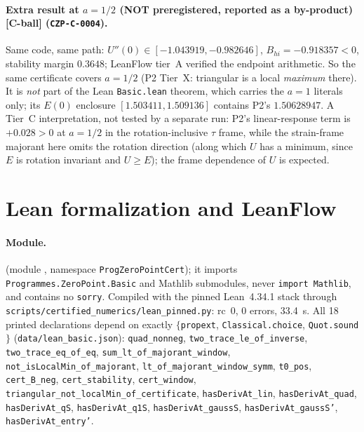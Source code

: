 \documentclass[10pt]{article}
\newcommand{\tCb}{\textcolor{blue!60!black}{\textsf{[C-ball]}}}
\newcommand{\lean}[1]{\texttt{#1}}
\begin{document}
\paragraph{Extra result at $a=1/2$ (NOT preregistered, reported as a by-product) \tCb{} (\texttt{CZP-C-0004}).} Same code, same path: $U''(0)\in[-1.043919,-0.982646]$, $B_{hi}=-0.918357<0$, stability margin $0.3648$; LeanFlow tier~A verified the endpoint arithmetic. So the same certificate covers $a=1/2$ (P2 Tier~X: triangular is a local \emph{maximum} there). It is \emph{not} part of the Lean \lean{Basic.lean} theorem, which carries the $a=1$ literals only; its $E(0)$ enclosure $[1.503411,1.509136]$ contains P2's $1.50628947$. A Tier~C interpretation, not tested by a separate run: P2's linear-response term is $+0.028>0$ at $a=1/2$ in the rotation-inclusive $\tau$ frame, while the strain-frame majorant here omits the rotation direction (along which $U$ has a minimum, since $E$ is rotation invariant and $U\ge E$); the frame dependence of $U$ is expected.

\section{Lean formalization and LeanFlow}\label{sec:lean}
\paragraph{Module.}  (module , namespace \lean{ProgZeroPointCert}); it imports \lean{Programmes.ZeroPoint.Basic} and Mathlib submodules, never \lean{import Mathlib}, and contains no \lean{sorry}. Compiled with the pinned Lean~4.34.1 stack through \texttt{scripts/certified\_numerics/lean\_pinned.py}: rc~0, 0 errors, 33.4~s. All 18 printed declarations depend on exactly $\{$\lean{propext}, \lean{Classical.choice}, \lean{Quot.sound}$\}$ (\texttt{data/lean\_basic.json}): \lean{quad\_nonneg}, \lean{two\_trace\_le\_of\_inverse}, \lean{two\_trace\_eq\_of\_eq}, \lean{sum\_lt\_of\_majorant\_window}, \lean{not\_isLocalMin\_of\_majorant}, \lean{lt\_of\_majorant\_window\_symm}, \lean{t0\_pos}, \lean{cert\_B\_neg}, \lean{cert\_stability}, \lean{cert\_window}, \lean{triangular\_not\_localMin\_of\_certificate}, \lean{hasDerivAt\_lin}, \lean{hasDerivAt\_quad}, \lean{hasDerivAt\_qS}, \lean{hasDerivAt\_q1S}, \lean{hasDerivAt\_gaussS}, \lean{hasDerivAt\_gaussS'}, \lean{hasDerivAt\_entry'}.
\end{document}
